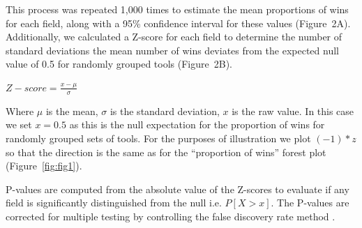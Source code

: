\documentclass[fleqn,10pt,doc,onecolumn]{SelfArx}%
\begin{document}
This process was repeated
1,000 times to estimate the mean proportions of wins for each field,
along with a 95\% confidence interval for these values (Figure~2A).
Additionally, we calculated a Z-score for each field to determine the
number of standard deviations the mean number of wins deviates from
the expected null value of 0.5 for randomly grouped tools (Figure~2B).

$Z-score=\frac{x-\mu}{\sigma}$

Where $\mu$ is the mean, $\sigma$ is the standard deviation, $x$ is the raw
value. In this case we set $x=0.5$ as this is the null expectation for
the proportion of wins for randomly grouped sets of tools. For the
purposes of illustration we plot $(-1)*z$ so that the direction is the
same as for the ``proportion of wins'' forest plot
(Figure~\ref{fig:fig1}). 

P-values are computed from the absolute value of the Z-scores to
evaluate if any field is significantly distinguished from the null
i.e. $P[X > x]$. The P-values are corrected for multiple testing by
controlling the false discovery rate method
\cite{benjamini1995controlling}.




\end{document}
